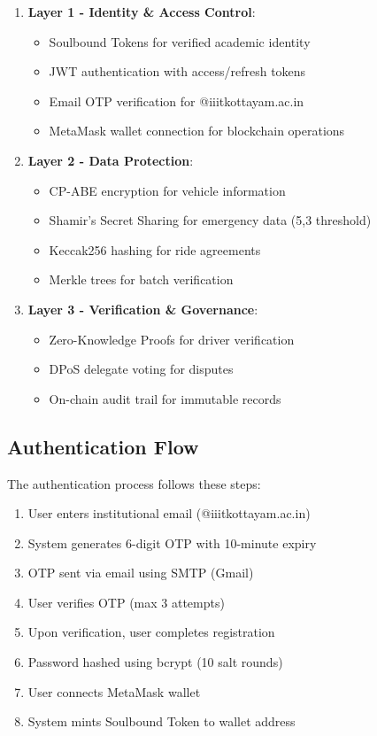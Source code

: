 \begin{enumerate}
    \item \textbf{Layer 1 - Identity \& Access Control}:
    \begin{itemize}
        \item Soulbound Tokens for verified academic identity
        \item JWT authentication with access/refresh tokens
        \item Email OTP verification for @iiitkottayam.ac.in
        \item MetaMask wallet connection for blockchain operations
    \end{itemize}
    
    \item \textbf{Layer 2 - Data Protection}:
    \begin{itemize}
        \item CP-ABE encryption for vehicle information
        \item Shamir's Secret Sharing for emergency data (5,3 threshold)
        \item Keccak256 hashing for ride agreements
        \item Merkle trees for batch verification
    \end{itemize}
    
    \item \textbf{Layer 3 - Verification \& Governance}:
    \begin{itemize}
        \item Zero-Knowledge Proofs for driver verification
        \item DPoS delegate voting for disputes
        \item On-chain audit trail for immutable records
    \end{itemize}
\end{enumerate}

\subsection{Authentication Flow}

The authentication process follows these steps:

\begin{enumerate}
    \item User enters institutional email (@iiitkottayam.ac.in)
    \item System generates 6-digit OTP with 10-minute expiry
    \item OTP sent via email using SMTP (Gmail)
    \item User verifies OTP (max 3 attempts)
    \item Upon verification, user completes registration
    \item Password hashed using bcrypt (10 salt rounds)
    \item User connects MetaMask wallet
    \item System mints Soulbound Token to wallet address
\end{enumerate}

